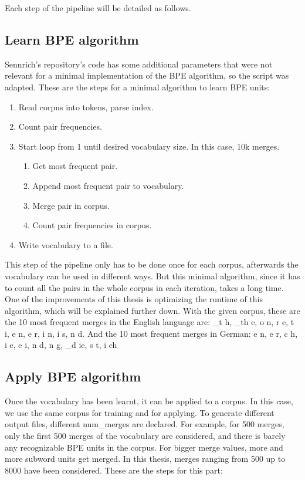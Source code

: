 Each step of the pipeline will be detailed as follows.

\subsection{Learn BPE algorithm}

Sennrich's repository's code has some additional parameters that were not relevant for a minimal implementation of the BPE algorithm, so the script was adapted. These are the steps for a minimal algorithm to learn BPE units:

\begin{enumerate}
	\item Read corpus into tokens, parse index.
	\item Count pair frequencies.
	\item Start loop from 1 until desired vocabulary size. In this case, 10k merges.
	\begin{enumerate}
		\item Get most frequent pair.
		\item Append most frequent pair to vocabulary.
		\item Merge pair in corpus.
		\item Count pair frequencies in corpus.
	\end{enumerate}
	\item Write vocabulary to a file.
\end{enumerate}

This step of the pipeline only has to be done once for each corpus, afterwards the vocabulary can be used in different ways. But this minimal algorithm, since it has to count all the pairs in the whole corpus in each iteration, takes a long time. One of the improvements of this thesis is optimizing the runtime of this algorithm, which will be explained further down. With the given corpus, these are the 10 most frequent merges in the English language are: \_t h, \_th e, o n, r e, t i, e n, e r, i n, i s, n d. And the 10 most frequent merges in German: e n, e r, c h, i e, e i, n d, n g, \_d ie, s t, i ch

\subsection{Apply BPE algorithm}

Once the vocabulary has been learnt, it can be applied to a corpus. In this case, we use the same corpus for training and for applying. To generate different output files, different num\_merges are declared. For example, for 500 merges, only the first 500 merges of the vocabulary are considered, and there is barely any recognizable BPE units in the corpus. For bigger merge values, more and more subword units get merged. In this thesis, merges ranging from 500 up to 8000 have been considered. These are the steps for this part:

